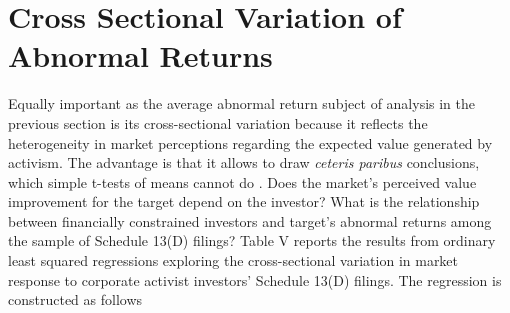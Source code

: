\documentclass[12pt]{article}
\begin{document}
\section{Cross Sectional Variation of Abnormal Returns}

\noindent Equally important as the average abnormal return subject of analysis in the previous section is its cross-sectional variation because it reflects the heterogeneity in market perceptions regarding the expected value generated by activism. The advantage is that it allows to draw \emph{ceteris paribus} conclusions, which simple t-tests of means cannot do \citep[p.111]{Khatami2014}. Does the market's perceived value improvement for the target depend on the investor? What is the relationship between financially constrained investors and target's abnormal returns among the sample of Schedule 13(D) filings?
Table V reports the results from ordinary least squared regressions exploring the cross-sectional variation in market response to corporate activist investors' Schedule 13(D) filings. The regression is constructed as follows 
\end{document}
